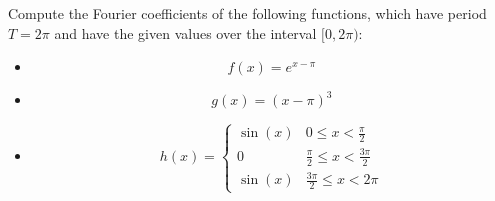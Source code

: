 \documentclass[11pt]{article}
\begin{document}




\begin{exercise}
    Compute the Fourier coefficients of the following functions, which have period $T = 2\pi$ and have the given values over the interval $[0,2\pi)$:
    \begin{itemize}
     \item 
     \[
        f(x) = e^{x - \pi}
     \]
     \item 
     \[
        g(x) = {(x - \pi)^3}
     \]
     \item 
     \[
        h(x) = \left\{\begin{array}{ll}
            \sin(x) & 0 \leq x < \frac \pi 2
            \\
            0   & \frac \pi 2 \leq x < \frac{3\pi}{2} 
            \\
            \sin(x) & \frac {3\pi} 2 \leq x < 2\pi
        \end{array}\right.
     \]
    \end{itemize}
\end{exercise}
\end{document}
